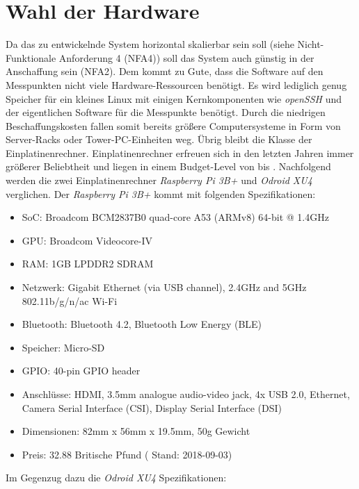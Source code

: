 \documentclass[titlepage]{report}
\begin{document}
\section*{Wahl der Hardware}
Da das zu entwickelnde System horizontal skalierbar sein soll (siehe
Nicht-Funktionale Anforderung 4 (NFA4)) soll das System auch günstig in
der Anschaffung sein (NFA2). Dem kommt zu Gute, dass die Software auf den
Messpunkten nicht viele Hardware\hyp{}Ressourcen benötigt. Es wird
lediglich genug Speicher für ein kleines Linux mit einigen
Kernkomponenten wie \emph{openSSH} und der eigentlichen Software für die
Messpunkte benötigt. Durch die niedrigen Beschaffungskosten fallen somit
bereits größere Computersysteme in Form von Server\hyp{}Racks oder
Tower\hyp{}PC\hyp{}Einheiten weg. Übrig bleibt die Klasse der
Einplatinenrechner. Einplatinenrechner erfreuen sich in den letzten
Jahren immer größerer Beliebtheit und liegen in einem Budget\hyp{}Level
von  bis . Nachfolgend werden die zwei Einplatinenrechner
\emph{Raspberry Pi 3B+} und \emph{Odroid XU4} verglichen.
Der \emph{Raspberry Pi 3B+} kommt mit folgenden Spezifikationen\cite{RASPI}:
\begin{itemize}
    \item SoC: Broadcom BCM2837B0 quad-core A53 (ARMv8) 64-bit @ 1.4GHz
    \item GPU: Broadcom Videocore-IV
    \item RAM: 1GB LPDDR2 SDRAM
    \item Netzwerk: Gigabit Ethernet (via USB channel), 2.4GHz and 5GHz 802.11b/g/n/ac Wi-Fi
    \item Bluetooth: Bluetooth 4.2, Bluetooth Low Energy (BLE)
    \item Speicher: Micro-SD
    \item GPIO: 40-pin GPIO header
    \item Anschlüsse: HDMI, 3.5mm analogue audio-video jack, 4x USB 2.0, Ethernet, Camera Serial Interface
        (CSI), Display Serial Interface (DSI)
    \item Dimensionen: 82mm x 56mm x 19.5mm, 50g Gewicht
    \item Preis: 32.88 Britische Pfund\cite{RASPI_PRICE} ( Stand: 2018-09-03)
\end{itemize}
Im Gegenzug dazu die \emph{Odroid XU4} Spezifikationen\cite{ODROID}:
\end{document}
